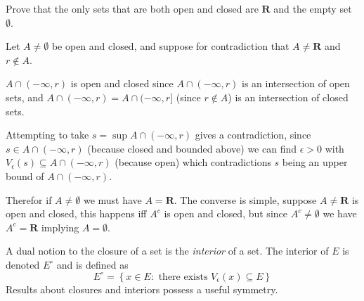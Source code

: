 \begin{exercise}
  Prove that the only sets that are both open and closed are $\mathbf{R}$ and the empty set $\emptyset$.
\end{exercise}

\begin{solution}
  Let $A \ne \emptyset$ be open and closed, and suppose for contradiction that $A \ne \mathbf R$ and $r \notin A$.

  $A \cap (-\infty, r)$ is open and closed since $A \cap (-\infty, r)$ is an intersection of open sets, and $A \cap (-\infty, r) = A \cap (-\infty, r]$ (since $r \notin A$) is an intersection of closed sets.

  Attempting to take $s = \sup A \cap (-\infty, r)$ gives a contradiction, since $s \in A \cap (-\infty, r)$ (because closed and bounded above) we can find $\epsilon > 0$ with $V_\epsilon(s) \subseteq A \cap (-\infty, r)$ (because open) which contradictions $s$ being an upper bound of $A \cap (-\infty, r)$.

  Therefor if $A \ne \emptyset$ we must have $A = \mathbf{R}$. The converse is simple, suppose $A \ne \mathbf{R}$ is open and closed, this happens iff $A^c$ is open and closed, but since $A^c \ne \emptyset$ we have $A^c = \mathbf{R}$ implying $A = \emptyset$.
\end{solution}

\begin{exercise}
  A dual notion to the closure of a set is the \emph{interior} of a set. The interior of $E$ is denoted $E^{\circ}$ and is defined as
  $$
  E^{\circ}=\left\{x \in E: \text { there exists } V_{\epsilon}(x) \subseteq E\right\}
  $$
  Results about closures and interiors possess a useful symmetry.
\end{exercise}

